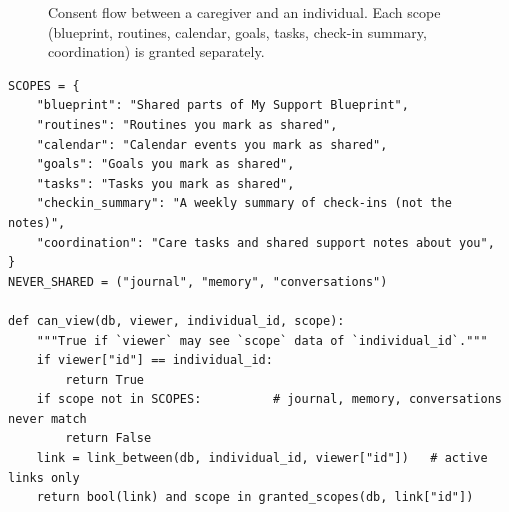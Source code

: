 \documentclass[11pt,a4paper]{article}
\newcommand{\code}[1]{\texttt{#1}}
\begin{document}
\begin{figure}[H]
\centering
{}
\caption{Consent flow between a caregiver and an individual. Each scope (blueprint, routines, calendar, goals, tasks, check-in summary, coordination) is granted separately.}
\label{fig:consent}
\end{figure}

\par\noindent\begin{minipage}{\linewidth}\begin{lstlisting}[caption={Every caregiver read is checked against the granted scopes (\code{nbapp/consent.py}).},label={lst:canview}]
SCOPES = {
    "blueprint": "Shared parts of My Support Blueprint",
    "routines": "Routines you mark as shared",
    "calendar": "Calendar events you mark as shared",
    "goals": "Goals you mark as shared",
    "tasks": "Tasks you mark as shared",
    "checkin_summary": "A weekly summary of check-ins (not the notes)",
    "coordination": "Care tasks and shared support notes about you",
}
NEVER_SHARED = ("journal", "memory", "conversations")

def can_view(db, viewer, individual_id, scope):
    """True if `viewer` may see `scope` data of `individual_id`."""
    if viewer["id"] == individual_id:
        return True
    if scope not in SCOPES:          # journal, memory, conversations never match
        return False
    link = link_between(db, individual_id, viewer["id"])   # active links only
    return bool(link) and scope in granted_scopes(db, link["id"])
\end{lstlisting}\end{minipage}\par
\end{document}

